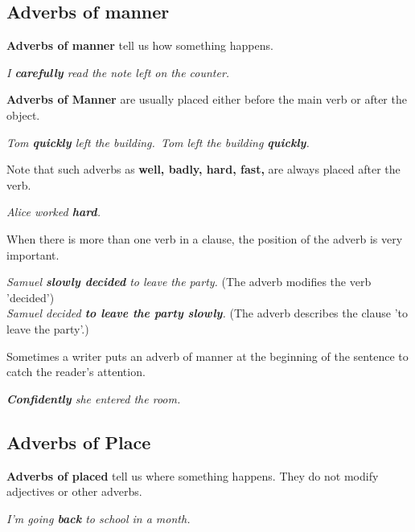 \documentclass[hidelinks,10pt,a4paper]{article}
\begin{document}
\subsection{Adverbs of manner}
\textbf{Adverbs of manner} tell us how something happens.

\begin{center}
	\textit{I \textbf{carefully} read the note left on the counter.}
\end{center}

\textbf{Adverbs of Manner} are usually placed either before the main verb or after the object.

\begin{center}
	\textit{Tom \textbf{quickly} left the building.\
	Tom left the building \textbf{quickly}. }
\end{center}

Note that such adverbs as \textbf{well, badly, hard, fast,} are always placed after the verb.

\begin{center}
	\textit{  Alice worked \textbf{hard}.}
\end{center}
When there is more than one verb in a clause, the position of the adverb is very important.

\begin{center}
	\textit{Samuel \textbf{slowly decided} to leave the party.} (The adverb modifies the verb 'decided')\\
	\textit{Samuel decided \textbf{to leave the party slowly}.} (The adverb describes the clause 'to leave the party'.)
\end{center}

Sometimes a writer puts an adverb of manner at the beginning of the sentence to catch the reader's attention.

\begin{center}
	\textit{\textbf{Confidently} she entered the room.}
\end{center}

\subsection{Adverbs of Place}
\textbf{Adverbs of placed} tell us where something happens. They do not modify adjectives or other adverbs.

\begin{center}
	\textit{I'm going \textbf{back} to school in a month.}
\end{center}
\end{document}
